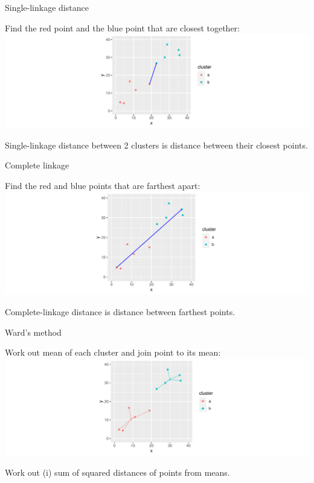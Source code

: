 \documentclass[
  ignorenonframetext,
]{beamer}
\begin{document}
\begin{frame}{Single-linkage distance}
\protect\hypertarget{single-linkage-distance}{}

Find the red point and the blue point that are closest together:
\includegraphics{slides_d29_files/figure-beamer/unnamed-chunk-353-1.pdf}

Single-linkage distance between 2 clusters is distance between their
closest points.

\end{frame}

\begin{frame}{Complete linkage}
\protect\hypertarget{complete-linkage}{}

Find the red and blue points that are farthest apart:
\includegraphics{slides_d29_files/figure-beamer/unnamed-chunk-354-1.pdf}

Complete-linkage distance is distance between farthest points.

\end{frame}

\begin{frame}{Ward's method}
\protect\hypertarget{wards-method}{}

Work out mean of each cluster and join point to its mean:
\includegraphics{slides_d29_files/figure-beamer/unnamed-chunk-355-1.pdf}

Work out (i) sum of squared distances of points from means.

\end{frame}
\end{document}
